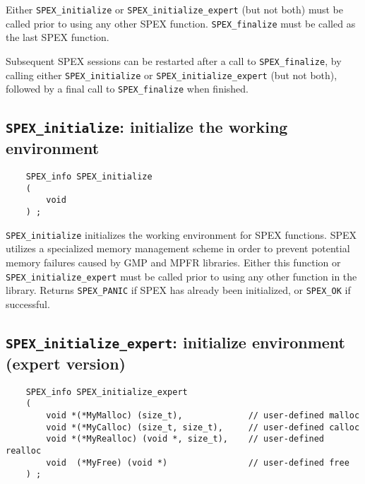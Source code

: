 \documentclass[12pt]{report}
\theoremstyle{definition}
\begin{document}
Either \verb|SPEX_initialize| or \verb|SPEX_initialize_expert| (but not both)
must be called prior to using any other SPEX function.  \verb|SPEX_finalize|
must be called as the last SPEX function.

Subsequent SPEX sessions can be restarted after a call to
\verb|SPEX_finalize|, by calling either \verb|SPEX_initialize| or
\verb|SPEX_initialize_expert| (but not both), followed by a final call to
\verb|SPEX_finalize| when finished.

\newpage
\cprotect\subsection{\verb|SPEX_initialize|: initialize the working environment}

\begin{mdframed}[userdefinedwidth=6in]
{\footnotesize
\begin{verbatim}
    SPEX_info SPEX_initialize
    (
        void
    ) ;
\end{verbatim}
} \end{mdframed}

\verb|SPEX_initialize| initializes the working environment for SPEX
functions.  SPEX utilizes a specialized memory management scheme in order to
prevent potential memory failures caused by GMP and MPFR libraries.  Either
this function or \verb|SPEX_initialize_expert| must be called prior to using
any other function in the library.  Returns \verb|SPEX_PANIC| if SPEX has
already been initialized, or \verb|SPEX_OK| if successful.

\cprotect\subsection{\verb|SPEX_initialize_expert|: initialize environment
(expert version)}\label{ss:SPEX_initialize_expert}

\begin{mdframed}[userdefinedwidth=6in]
{\footnotesize
\begin{verbatim}
    SPEX_info SPEX_initialize_expert
    (
        void *(*MyMalloc) (size_t),             // user-defined malloc
        void *(*MyCalloc) (size_t, size_t),     // user-defined calloc
        void *(*MyRealloc) (void *, size_t),    // user-defined realloc
        void  (*MyFree) (void *)                // user-defined free
    ) ;
\end{verbatim}
} \end{mdframed}
\end{document}
